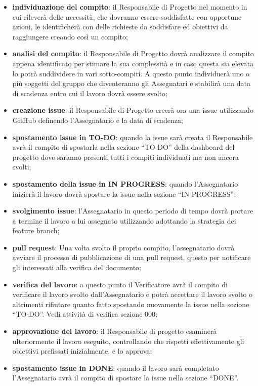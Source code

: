 			\begin{itemize}
				\item\textbf{individuazione del compito}: il Responsabile di Progetto nel momento in cui rileverà delle necessità, che dovranno essere soddisfatte con opportune azioni, le identificherà con delle richieste da soddisfare ed obiettivi da raggiungere creando così un compito;
				\item\textbf{analisi del compito}: il Responsabile di Progetto dovrà analizzare il compito appena identificato per stimare la sua complessità e in caso questa sia elevata lo potrà suddividere in vari sotto-compiti. A questo punto individuerà uno o più soggetti del gruppo che diventeranno gli Assegnatari e stabilirà una data di scadenza entro cui il lavoro dovrà essere svolto;
				\item\textbf{creazione issue}: il Responsabile di Progetto creerà ora una issue utilizzando GitHub definendo l’Assegnatario e la data di scadenza;
				\item\textbf{spostamento issue in TO-DO}: quando la issue sarà creata il Responsabile avrà il compito di spostarla nella sezione “TO-DO” della dashboard del progetto dove saranno presenti tutti i compiti individuati ma non ancora svolti; 
				\item\textbf{spostamento della issue in IN PROGRESS}: quando l’Assegnatario inizierà il lavoro dovrà spostare la issue nella sezione “IN PROGRESS”;
				\item\textbf{svolgimento issue}: l’Assegnatario in questo periodo di tempo dovrà portare a termine il lavoro a lui assegnato utilizzando adottando la strategia dei feature branch;
				\item\textbf{pull request}: Una volta svolto il proprio compito, l'assegnatario dovrà avviare il processo di pubblicazione di una pull request, questo per notificare gli interessati alla verifica del documento;
				\item\textbf{verifica del lavoro}: a questo punto il Verificatore avrà il compito di verificare il lavoro svolto dall’Assegnatario e potrà accettare il lavoro svolto o altrimenti rifiutare quanto fatto spostando nuovamente la issue nella sezione “TO-DO”. Vedi attività di verifica sezione 000;
				\item\textbf{approvazione del lavoro}: il Responsabile di progetto esaminerà ulteriormente il lavoro eseguito, controllando che rispetti effettivamente gli obiettivi prefissati inizialmente, e lo approva;
				\item\textbf{spostamento issue in DONE}: quando il lavoro sarà completato l’Assegnatario avrà il compito di spostare la issue nella sezione “DONE”.
			\end{itemize}
